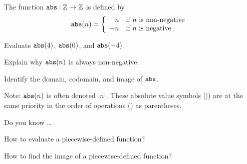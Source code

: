 \begin{exer}[\exerP] %
\label{exer_absolute_value}
    The function $\texttt{abs}: \mathbb{Z} \to \mathbb{Z}$ is defined by 
    $$\texttt{abs}(n)=
    \left\{
        \begin{array}{rl}
            n & \text{if } n \text{ is non-negative} \\
            -n & \text{if } n \text{ is negative}
        \end{array}
    \right.$$
        \begin{exerpart}
            \item Evaluate $\texttt{abs}(4)$, $\texttt{abs}(0)$, and $\texttt{abs}(-4)$.
            \item Explain why $\texttt{abs}(n)$ is always non-negative.
            \item Identify the domain, codomain, and image of $\texttt{abs}$.
        \end{exerpart}
        Note: $\texttt{abs}(n)$ is often denoted $|n|$.  These absolute value symbols ($|$) are at the same priority in the order of operations () as parentheses.
\end{exer}

\begin{exer}[\exerR] %
\label{exer_dyk_fn_piecewise}
    Do you know \ldots
        \begin{exerpart}
            \item How to evaluate a piecewise-defined function? 
            \item How to find the image of a piecewise-defined function?
        \end{exerpart}
\end{exer}

